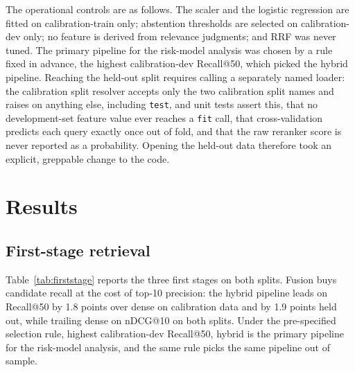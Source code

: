 \documentclass[11pt,a4paper]{article}
\begin{document}
The operational controls are as follows. The scaler and the logistic regression are fitted on
calibration-train only; abstention thresholds are selected on calibration-dev only; no feature
is derived from relevance judgments; and RRF was never tuned. The primary pipeline for the
risk-model analysis was chosen by a rule fixed in advance, the highest calibration-dev
Recall@50, which picked the hybrid pipeline. Reaching the held-out split requires calling
a separately named loader: the calibration split resolver accepts only the two calibration
split names and raises on anything else, including \texttt{test}, and unit tests assert this,
that no development-set feature value ever reaches a \texttt{fit} call, that cross-validation
predicts each query exactly once out of fold, and that the raw reranker score is never reported
as a probability. Opening the held-out data therefore took an explicit, greppable change to the
code.

\section{Results}

\subsection{First-stage retrieval}
\label{sec:firststage}

Table~\ref{tab:firststage} reports the three first stages on both splits. Fusion buys candidate
recall at the cost of top-10 precision: the hybrid pipeline leads on Recall@50 by 1.8 points
over dense on calibration data and by 1.9 points held out, while trailing dense on nDCG@10 on
both splits. Under the pre-specified selection rule, highest calibration-dev Recall@50, hybrid
is the primary pipeline for the risk-model analysis, and the same rule picks the same pipeline
out of sample.
\end{document}
